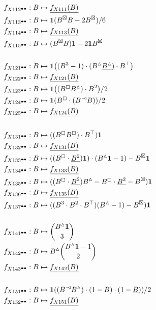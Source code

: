 \documentclass{article}
\theoremstyle{plain}
\begin{document}
\begin{align*}
f_{X112^\dumbbell}: B&\mapsto \underline{f_{X111}(B)}\\
f_{X113^\dumbbell}: B&\mapsto {\bf 1}(B^\boxtimes B - 2B^\boxtimes)/6\\
f_{X114^\dumbbell}: B&\mapsto \underline{f_{X113}(B)}\\
f_{X115^\dumbbell}: B&\mapsto (B^\boxtimes B){\bf 1} - 2{\bf 1}B^\boxtimes\\
&\\%
f_{X121^\dumbbell}: B&\mapsto {\bf 1}\big((B^3-1)\cdot(B^\vartriangle\underline{B^\vartriangle})\cdot B^\top\big)\\
f_{X122^\dumbbell}: B&\mapsto \underline{f_{X121}(B)}\\
f_{X123^\dumbbell}: B&\mapsto {\bf 1}\big((B^\boxempty B^\vartriangle)\cdot B^2\big)/2\\
f_{X124^\dumbbell}: B&\mapsto {\bf 1}(B^\boxempty\cdot(B^\arro B))/2\\
f_{X125^\dumbbell}: B&\mapsto \underline{f_{X124}(B)}\\
&\\%
f_{X131^\dumbbell}: B&\mapsto ((B^\boxempty B^\boxempty)\cdot B^\top){\bf 1}\\
f_{X132^\dumbbell}: B&\mapsto \underline{f_{X131}(B)}\\
f_{X133^\dumbbell}: B&\mapsto ((B^\boxempty\cdot\underline{B^2}){\bf 1})\cdot(B^\vartriangle{\bf 1}-1)-B^\boxtimes{\bf 1}\\
f_{X134^\dumbbell}: B&\mapsto \underline{f_{X133}(B)}\\
f_{X135^\dumbbell}: B&\mapsto ((B^\boxempty\cdot\underline{B^2})B^\vartriangle-B^\boxempty\cdot\underline{B^2}-B^\boxtimes){\bf 1}\\
f_{X136^\dumbbell}: B&\mapsto \underline{f_{X135}(B)}\\
f_{X137^\dumbbell}: B&\mapsto ((B^3\cdot B^2\cdot B^\top)(B^\vartriangle-1)-B^\boxtimes){\bf 1}\\
&\\%
f_{X141^\dumbbell}: B&\mapsto \binom{B^\vartriangle{\bf 1}}{3}\\
f_{X142^\dumbbell}: B&\mapsto B^\vartriangle \binom{B^\vartriangle{\bf 1}-1}{2}\\
f_{X143^\dumbbell}: B&\mapsto \underline{f_{X142}(B)}\\
&\\%
f_{X151^\dumbbell}: B&\mapsto {\bf 1}((B^\arro B^\vartriangle)\cdot(1-B)\cdot(1-\underline{B}))/2\\
f_{X152^\dumbbell}: B&\mapsto \underline{f_{X151}(B)}\\

\end{align*}
\end{document}
